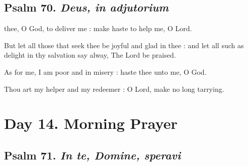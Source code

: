 \subsection{Psalm 70. \textit{Deus, in adjutorium}}

 thee, O God, to deliver me : make haste to help me, O Lord.\par
{}
But let all those that seek thee be joyful and glad in thee : and let all such as delight in thy salvation say alway, The Lord be praised.\par
{}As for me, I am poor and in misery : haste thee unto me, O God.\par
{}Thou art my helper and my redeemer : O Lord, make no long tarrying.\par

\section*{Day 14. Morning Prayer}

\subsection{Psalm 71. \textit{In te, Domine, speravi}}

